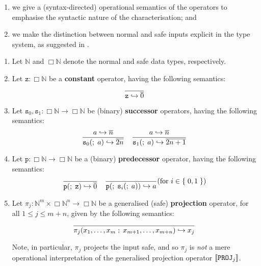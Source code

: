 \begin{enumerate}[label=(\arabic*)]

\item we give a (syntax-directed) operational semantics of the operators to
emphasise the syntactic nature of the characterisation; and

\item we make the distinction between normal and safe inputs explicit in the
type system, as suggested in \cite[\textsection\ 5]{bellantoni-cook-1992}.

\end{enumerate}

\begin{definition} \cite{bellantoni-cook-1992}

\begin{enumerate}[label=(\arabic*)]

\item Let $\mathbb{N}$ and $\Box\mathbb{N}$ denote the normal and safe data
types, respectively.

\item Let $\mathtt{z} : \Box\mathbb{N}$ be a \textbf{constant} operator, having
the following semantics:$$
%
\axiom{ \mathtt{z} \goesto \repr{0} }
%
$$

\item Let $\mathtt{s}_0,\mathtt{s}_1 : \Box\mathbb{N} \rightarrow
\Box\mathbb{N}$ be (binary) \textbf{successor} operators, having the following
semantics:$$
%
\judgement{ a \goesto \repr{n} }{
%
  \mathtt{s}_0\p{\semic{} a} \goesto \repr{2n}
%
} \quad
%
\judgement{ a \goesto \repr{n} }{
%
  \mathtt{s}_1\p{\semic{} a} \goesto \repr{2n + 1}
%
}
%
$$

\item Let $\mathtt{p} : \Box\mathbb{N} \rightarrow \Box\mathbb{N}$ be a
(binary) \textbf{predecessor} operator, having the following semantics: $$
%
\axiom{
%
  \mathtt{p}\p{\semic{} \mathtt{z}} \goesto \repr{0}
%
}
%
\quad\axiom{
%
  \mathtt{p}\p{\semic{} \mathtt{s}_i\p{\semic{} a}} \goesto a
%
}\p{\text{for $i \in \set{0,1}$}}
%
$$

\item Let $\pi_j : \mathbb{N}^m \times \Box\mathbb{N}^n \rightarrow
\Box\mathbb{N}$ be a generalised (safe) \textbf{projection} operator, for all
$1 \leq j \leq m+n$, given by the following semantics:$$
%
\axiom{ \pi_j\p{x_1,\ldots,x_m \semic{} x_{m+1},\ldots,x_{m+n}} \goesto x_j }
%
$$

Note, in particular, $\pi_j$ projects the input safe, and so $\pi_j$ is
\emph{not} a mere operational interpretation of the generalised projection
operator ${\mathopen{}\left\llbracket{\mathtt{PROJ}_j}\right\rrbracket\mathclose{}}$.


\end{enumerate}
\end{definition}

